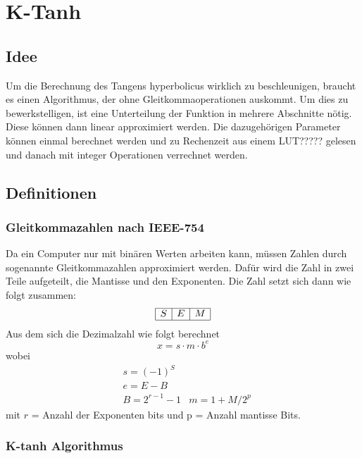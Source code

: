 %
%
%
\section{K-Tanh
\label{transfer:section:teil4}}

\subsection{Idee
	\label{transfer:subsection:Ktanh-Idee}}
Um die Berechnung des Tangens hyperbolicus wirklich zu beschleunigen, braucht es einen Algorithmus, der ohne Gleitkommaoperationen auskommt. Um dies zu bewerkstelligen, ist eine Unterteilung der Funktion in mehrere Abschnitte nötig. Diese können dann linear approximiert werden. Die dazugehörigen Parameter können einmal berechnet werden und zu Rechenzeit aus einem LUT????? gelesen und danach mit integer Operationen verrechnet werden.


\subsection{Definitionen
	\label{transfer:subsection:Ktanh-Definition}}

\subsubsection{Gleitkommazahlen nach IEEE-754
	\label{transfer:subsection:Ktanh-Algorithmus:Gleitkommazahl}}
Da ein Computer nur mit binären Werten arbeiten kann, müssen Zahlen durch sogenannte Gleitkommazahlen approximiert werden. Dafür wird die Zahl in zwei Teile aufgeteilt, die Mantisse und den Exponenten. Die Zahl setzt sich dann wie folgt zusammen:
$$
\begin{array}{|l|l|l|}
	\hline S & E & M \\
	\hline
\end{array}
$$
Aus dem sich die Dezimalzahl wie folgt berechnet
$$
x=s \cdot m \cdot b^{e}
$$
wobei
$$
\begin{aligned}
	&s=(-1)^{S} \\
	&e=E-B\\
	&B=2^{r-1}-1
	&m=1+M / 2^{p}
\end{aligned}
$$
mit $r$ = Anzahl der Exponenten bits und p = Anzahl mantisse Bits.


\subsubsection{K-tanh Algorithmus
\label{transfer:subsection:Ktanh-Algorithmus}}
\cite{transfer:DBLP:journals/corr/abs-1909-07729}

